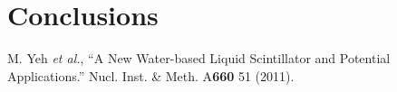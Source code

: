 \documentclass[11pt,prd,letterpaper,amsmath,amssymb,final,nofootinbib
,unsortedaddress,superscriptaddress
]{revtex4-1}
\begin{document}
%
%
%
%
%
%


\section{Conclusions}

\begin{thebibliography}{00}

M. Yeh {\it et al.}, { ``A New Water-based Liquid Scintillator and Potential Applications.''} 
Nucl. Inst. \& Meth. A{\bf 660} 51 (2011).

\end{thebibliography}
\end{document}
